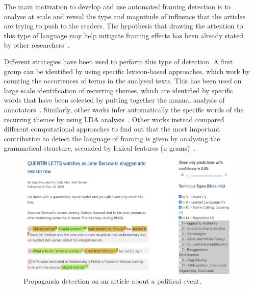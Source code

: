 The main motivation to develop and use automated framing detection is to analyse at scale and reveal the type and magnitude of influence that the articles are trying to push to the readers. The hypothesis that drawing the attention to this type of language may help mitigate framing effects has been already stated by other researchers~\cite{baumer2015testing}.


Different strategies have been used to perform this type of detection.
A first group can be identified by using specific lexicon-based approaches, which work by counting the occurrences of terms in the analysed texts.
This has been used on large scale identification of recurring themes, which are identified by specific words that have been selected by putting together the manual analysis of annotators~\cite{field2018framing}.
Similarly, other works infer automatically the specific words of the recurring themes by using LDA analysis~\cite{tsur2015frame}.
Other works instead compared different computational approaches to find out that the most important contribution to detect the language of framing is given by analysing the grammatical structure, seconded by lexical features (n-grams)~\cite{baumer2015testing}.


\begin{figure}[!htb]
    \centering
    \includegraphics[width=\linewidth]{figures/brexit_propaganda.png}
    \caption{Propaganda detection on an article about a political event.}
    \label{fig:brexit_propaganda}
\end{figure}

